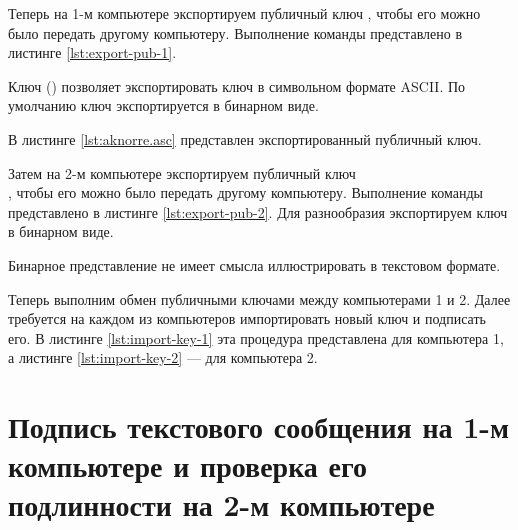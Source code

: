 Теперь на 1-м компьютере экспортируем публичный ключ , чтобы его можно было передать другому компьютеру. Выполнение команды представлено в листинге \ref{lst:export-pub-1}.



Ключ  () позволяет экспортировать ключ в символьном формате ASCII. По умолчанию ключ экспортируется в бинарном виде.

В листинге \ref{lst:aknorre.asc} представлен экспортированный публичный ключ.




Затем на 2-м компьютере экспортируем публичный ключ\\ , чтобы его можно было передать другому компьютеру. Выполнение команды представлено в листинге \ref{lst:export-pub-2}. Для разнообразия экспортируем ключ в бинарном виде.



Бинарное представление не имеет смысла иллюстрировать в текстовом формате.

Теперь выполним обмен публичными ключами между компьютерами 1 и 2. Далее требуется на каждом из компьютеров импортировать новый ключ и подписать его. В листинге \ref{lst:import-key-1} эта процедура представлена для компьютера 1, а листинге \ref{lst:import-key-2} --- для компьютера 2.





\section{Подпись текстового сообщения на 1-м компьютере и проверка его подлинности на 2-м компьютере}

